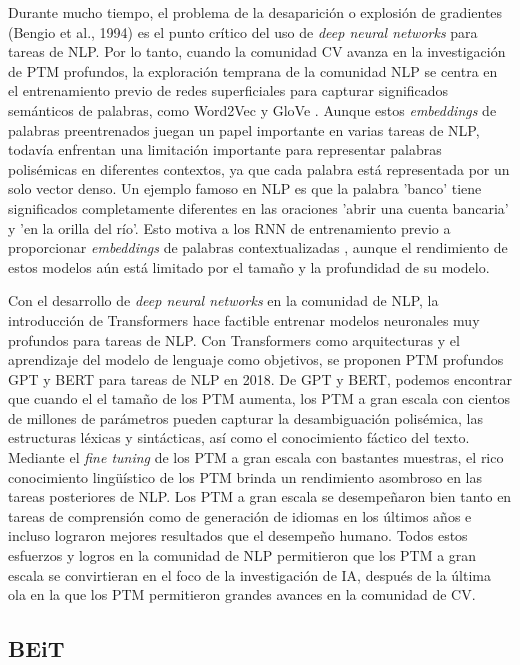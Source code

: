 Durante mucho tiempo, el problema de la desaparición o explosión de gradientes (Bengio et al., 1994) es el punto crítico del uso de \textit{deep neural networks} para tareas de NLP. Por lo tanto, cuando la comunidad CV avanza en la investigación de PTM profundos, la exploración temprana de la comunidad NLP se centra en el entrenamiento previo de redes superficiales para capturar significados semánticos de palabras, como Word2Vec \parencite{87} y GloVe \parencite{88}. Aunque estos \textit{embeddings} de palabras preentrenados juegan un papel importante en varias tareas de NLP, todavía enfrentan una limitación importante para representar palabras polisémicas en diferentes contextos, ya que cada palabra está representada por un solo vector denso. Un ejemplo famoso en NLP es que la palabra 'banco' tiene significados completamente diferentes en las oraciones 'abrir una cuenta bancaria' y 'en la orilla del río'. Esto motiva a los RNN de entrenamiento previo a proporcionar \textit{embeddings} de palabras contextualizadas \parencite{89} \parencite{90}, aunque el rendimiento de estos modelos aún está limitado por el tamaño y la profundidad de su modelo.  

Con el desarrollo de \textit{deep neural networks} en la comunidad de NLP, la introducción de Transformers \parencite{25} hace factible entrenar modelos neuronales muy profundos para tareas de NLP. Con Transformers como arquitecturas y el aprendizaje del modelo de lenguaje como objetivos, se proponen PTM profundos GPT \parencite{12} y BERT \parencite{11} para tareas de NLP en 2018. De GPT y BERT, podemos encontrar que cuando el el tamaño de los PTM aumenta, los PTM a gran escala con cientos de millones de parámetros pueden capturar la desambiguación polisémica, las estructuras léxicas y sintácticas, así como el conocimiento fáctico del texto. Mediante el \textit{fine tuning} de los PTM a gran escala con bastantes muestras, el rico conocimiento lingüístico de los PTM brinda un rendimiento asombroso en las tareas posteriores de NLP. Los PTM a gran escala se desempeñaron bien tanto en tareas de comprensión como de generación de idiomas en los últimos años e incluso lograron mejores resultados que el desempeño humano. Todos estos esfuerzos y logros en la comunidad de NLP permitieron que los PTM a gran escala se convirtieran en el foco de la investigación de IA, después de la última ola en la que los PTM permitieron grandes avances en la comunidad de CV.

\subsection{BEiT}

